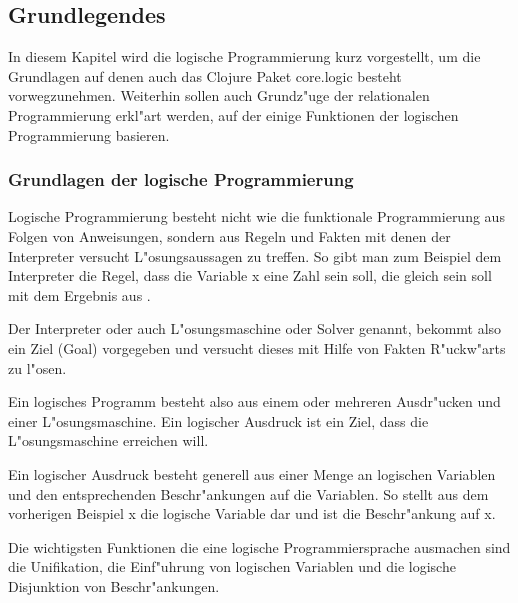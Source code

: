 \subsection{Grundlegendes}

In diesem Kapitel wird die logische Programmierung kurz vorgestellt, um die Grundlagen auf denen auch das Clojure Paket core.logic besteht vorwegzunehmen. Weiterhin sollen auch Grundz"uge der relationalen Programmierung erkl"art werden, auf der einige Funktionen der logischen Programmierung basieren.

\subsubsection{Grundlagen der logische Programmierung}

Logische Programmierung besteht nicht wie die funktionale Programmierung aus Folgen von Anweisungen, sondern aus Regeln und Fakten mit denen der Interpreter versucht L"osungsaussagen zu treffen. So gibt man zum Beispiel dem Interpreter die Regel, dass die Variable x eine Zahl sein soll, die gleich sein soll mit dem Ergebnis aus .

Der Interpreter oder auch L"osungsmaschine oder Solver genannt, bekommt also ein Ziel (Goal) vorgegeben und versucht dieses mit Hilfe von Fakten R"uckw"arts zu l"osen.


Ein logisches Programm besteht also aus einem oder mehreren Ausdr"ucken und einer L"osungsmaschine. Ein logischer Ausdruck ist ein Ziel, dass die L"osungsmaschine erreichen will.

Ein logischer Ausdruck besteht generell aus einer Menge an logischen Variablen und den entsprechenden Beschr"ankungen auf die Variablen. So stellt aus dem vorherigen Beispiel x die logische Variable dar und  ist die Beschr"ankung auf x.


Die wichtigsten Funktionen die eine logische Programmiersprache ausmachen sind die Unifikation, die Einf"uhrung von logischen Variablen und die logische Disjunktion von Beschr"ankungen.
